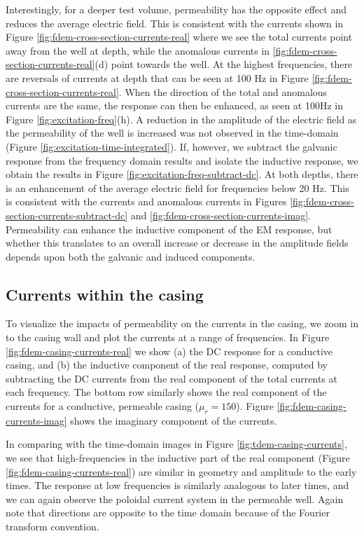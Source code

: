

Interestingly, for a deeper test volume, permeability has the opposite effect and reduces the average electric field. This is consistent with the currents shown in Figure \ref{fig:fdem-cross-section-currents-real} where we see the total currents point away from the well at depth, while the anomalous currents in \ref{fig:fdem-cross-section-currents-real}(d) point towards the well. At the highest frequencies, there are reversals of currents at depth that can be seen at 100 Hz in Figure \ref{fig:fdem-cross-section-currents-real}. When the direction of the total and anomalous currents are the same, the response can then be enhanced, as seen at 100Hz in Figure \ref{fig:excitation-freq}(h). A reduction in the amplitude of the electric field as the permeability of the well is increased was not observed in the time-domain (Figure \ref{fig:excitation-time-integrated}). If, however, we subtract the galvanic response from the frequency domain results and isolate the inductive response, we obtain the results in Figure \ref{fig:excitation-freq-subtract-dc}. At both depths, there is an enhancement of the average electric field for frequencies below 20 Hz. This is consistent with the currents and anomalous currents in Figures \ref{fig:fdem-cross-section-currents-subtract-dc} and \ref{fig:fdem-cross-section-currents-imag}. Permeability can enhance the inductive component of the EM response, but whether this translates to an overall increase or decrease in the amplitude fields depends upon both the galvanic and induced components.




\subsection{Currents within the casing}
To visualize the impacts of permeability on the currents in the casing, we zoom in to the casing wall and plot the currents at a range of frequencies. In Figure \ref{fig:fdem-casing-currents-real} we show (a) the DC response for a conductive casing, and (b) the inductive component of the real response, computed by subtracting the DC currents from the real component of the total currents at each frequency. The bottom row similarly shows the real component of the currents for a conductive, permeable casing ($\mu_r = 150$). Figure \ref{fig:fdem-casing-currents-imag} shows the imaginary component of the currents.

In comparing with the time-domain images in Figure \ref{fig:tdem-casing-currents}, we see that high-frequencies in the inductive part of the real component (Figure \ref{fig:fdem-casing-currents-real}) are similar in geometry and amplitude to the early times. The response at low frequencies is similarly analogous to later times, and we can again observe the poloidal current system in the permeable well. Again note that directions are opposite to the time domain because of the Fourier transform convention.



